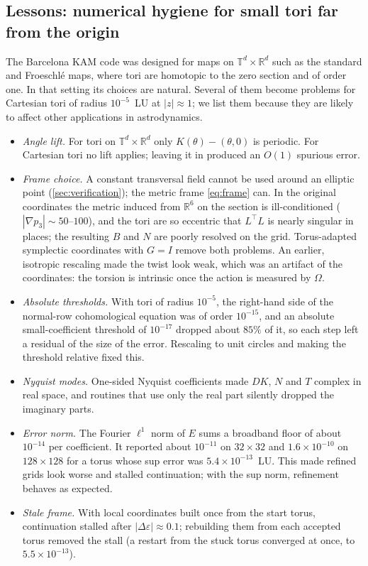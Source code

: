 \documentclass[11pt]{article}
\newcommand{\T}{\mathbb{T}}
\newcommand{\R}{\mathbb{R}}
\begin{document}
\subsection{Lessons: numerical hygiene for small tori far from the origin}\label{sec:lessons}
The Barcelona KAM code was designed for maps on $\T^d\times\R^d$ such as the standard and
Froeschl\'e maps, where tori are homotopic to the zero section and of order one. In that setting
its choices are natural. Several of them become problems for Cartesian tori of radius
$10^{-5}$~LU at $|z|\approx 1$; we list them because they are likely to affect other applications
in astrodynamics.
\begin{itemize}
\item \emph{Angle lift.} For tori on $\T^d\times\R^d$ only $K(\theta)-(\theta,0)$ is periodic. For
  Cartesian tori no lift applies; leaving it in produced an $O(1)$ spurious error.
\item \emph{Frame choice.} A constant transversal field cannot be used around an elliptic point
  (\cref{sec:verification}); the metric frame \eqref{eq:frame} can. In the original coordinates the
  metric induced from $\R^6$ on the section is ill-conditioned ($|\nabla p_3|\sim 50$--$100$), and
  the tori are so eccentric that $L^\top L$ is nearly singular in places; the resulting $B$ and $N$
  are poorly resolved on the grid. Torus-adapted symplectic coordinates with $G=I$ remove both
  problems. An earlier, isotropic rescaling made the twist look weak, which was an artifact of the
  coordinates: the torsion is intrinsic once the action is measured by $\Omega$.
\item \emph{Absolute thresholds.} With tori of radius $10^{-5}$, the right-hand side of the
  normal-row cohomological equation was of order $10^{-15}$, and an absolute small-coefficient
  threshold of $10^{-17}$ dropped about $85\%$ of it, so each step left a residual of the size of
  the error. Rescaling to unit circles and making the threshold relative fixed this.
\item \emph{Nyquist modes.} One-sided Nyquist coefficients made $DK$, $N$ and $T$ complex in real
  space, and routines that use only the real part silently dropped the imaginary parts.
\item \emph{Error norm.} The Fourier $\ell^1$ norm of $E$ sums a broadband floor of about
  $10^{-14}$ per coefficient. It reported about $10^{-11}$ on $32\times32$ and $1.6\times10^{-10}$
  on $128\times128$ for a torus whose sup error was $5.4\times10^{-13}$~LU. This made refined grids
  look worse and stalled continuation; with the sup norm, refinement behaves as expected.
\item \emph{Stale frame.} With local coordinates built once from the start torus, continuation
  stalled after $|\Delta\varepsilon|\approx0.1$; rebuilding them from each accepted torus removed
  the stall (a restart from the stuck torus converged at once, to $5.5\times10^{-13}$).
\end{itemize}
\end{document}
